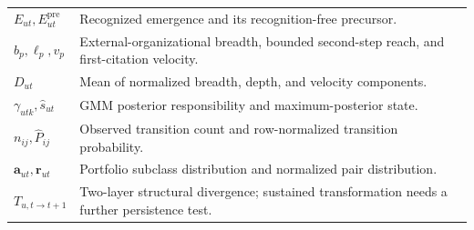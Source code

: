 \begin{longtable}{P{2.85cm}P{10.9cm}}
$E_{ut},E^{\mathrm{pre}}_{ut}$ & Recognized emergence and its recognition-free precursor.\\
$b_p,\ell_p,v_p$ & External-organizational breadth, bounded second-step reach, and first-citation velocity.\\
$D_{ut}$ & Mean of normalized breadth, depth, and velocity components.\\
$\gamma_{utk},\widehat s_{ut}$ & GMM posterior responsibility and maximum-posterior state.\\
$n_{ij},\widehat P_{ij}$ & Observed transition count and row-normalized transition probability.\\
$\mathbf{a}_{ut},\mathbf{r}_{ut}$ & Portfolio subclass distribution and normalized pair distribution.\\
$T_{u,t\rightarrow t+1}$ & Two-layer structural divergence; sustained transformation needs a further persistence test.\\
\bottomrule
\end{longtable}
\endgroup

